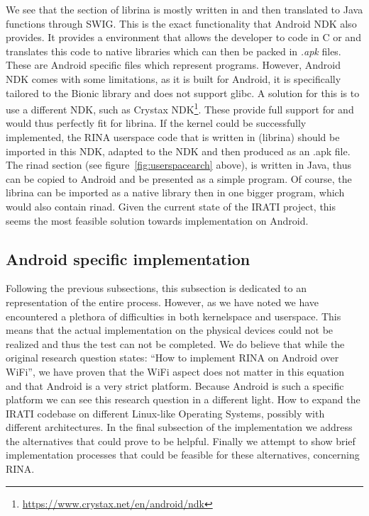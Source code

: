 We see that the section of librina is mostly written in \cpp and then translated to Java functions through SWIG. This is the exact functionality that Android NDK also provides. It provides a environment that allows the developer to code in C or \cpp and translates this code to native libraries which can then be packed in \emph{.apk} files. These are Android specific files which represent programs. However, Android NDK comes with some limitations, as it is built for Android, it is specifically tailored to the Bionic library and does not support glibc. A solution for this is to use a different NDK, such as Crystax NDK\footnote{\url{https://www.crystax.net/en/android/ndk}}. These provide full support for \cpp and would thus perfectly fit for librina. If the kernel could be successfully implemented, the RINA userspace code that is written in \cpp (librina) should be imported in this NDK, adapted to the NDK and then produced as an .apk file. The rinad section (see figure~\ref{fig:userspacearch} above), is written in Java, thus can be copied to Android and be presented as a simple program. Of course, the librina can be imported as a native library then in one bigger program, which would also contain rinad. Given the current state of the IRATI project, this seems the most feasible solution towards implementation on Android.

\subsection{Android specific implementation}


Following the previous subsections, this subsection is dedicated to an representation of the entire process. However, as we have noted we have encountered a plethora of difficulties in both kernelspace and userspace. This means that the actual implementation on the physical devices could not be realized and thus the test can not be completed. We do believe that while the original research question states: ``How to implement RINA on Android over WiFi'', we have proven that the WiFi aspect does not matter in this equation and that Android is a very strict platform. 
\npar
Because Android is such a specific platform we can see this research question in a different light. How to expand the IRATI codebase on different Linux-like Operating Systems, possibly with different architectures. In the final subsection of the implementation we address the alternatives that could prove to be helpful. Finally we attempt to show brief implementation processes that could be feasible for these alternatives, concerning RINA.

